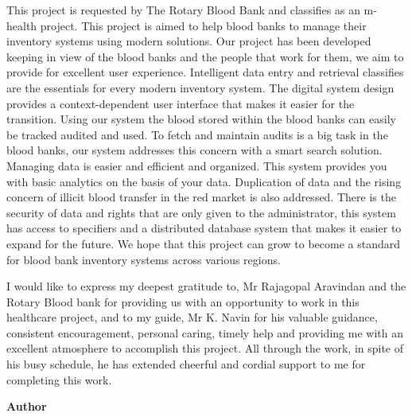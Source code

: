 \documentclass[BTech]{srmuthesis}
\begin{document}
\abstract
\begin{doublespacing}
{\large\noindent This project is requested by The Rotary Blood Bank and classifies as an m-health project. This project is aimed to help blood banks to manage their inventory systems using modern solutions. Our project has been developed keeping in view of the blood banks and the people that work for them, we aim to provide for excellent user experience. Intelligent data entry and retrieval classifies are the essentials for every modern inventory system. The digital system design provides a context-dependent user interface that makes it easier for the transition. Using our system the blood stored within the blood banks can easily be tracked audited and used. To fetch and maintain audits is a big task in the blood banks, our system addresses this concern with a smart search solution. Managing data is easier and efficient and organized. This system provides you with basic analytics on the basis of your data. Duplication of data and the rising concern of illicit blood transfer in the red market is also addressed. There is the security of data and rights that are only given to the administrator, this system has access to specifiers and a distributed database system that makes it easier to expand for the future. We hope that this project can grow to become a standard for blood bank inventory systems across various regions. }
\end{doublespacing}

\pagebreak
\acknowledgements
I would like to express my deepest gratitude to, Mr Rajagopal Aravindan and the Rotary Blood bank for providing us with an opportunity to work in this healthcare project, and to my guide, Mr K. Navin for his valuable guidance, consistent encouragement, personal caring, timely help and providing me with an excellent atmosphere to accomplish this project. All through the work, in spite of his busy schedule, he has extended cheerful and cordial support to me for completing this work.

\begin{flushright}
{\bf Author}
\end{flushright}

\begin{singlespace}
\tableofcontents
\thispagestyle{empty}

\listoftables
{}
\listoffigures
{}
\end{singlespace}
\end{document}
